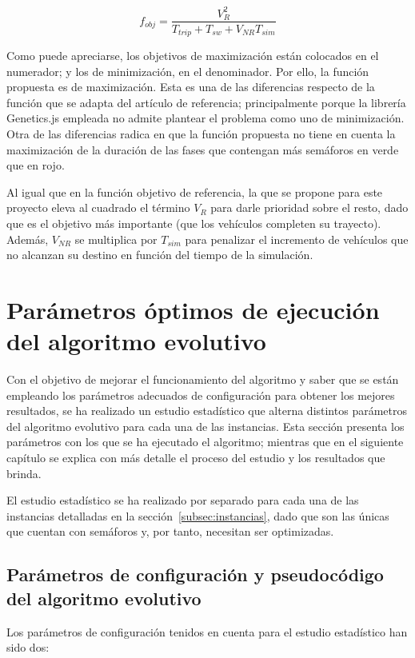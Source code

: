 $$
f_{obj} = \frac{V_R^2}{T_{trip} + T_{sw} + V_{NR} T_{sim}}
$$

Como puede apreciarse, los objetivos de maximización están colocados en el numerador; y los de minimización, en el denominador. Por ello, la función propuesta es de maximización. Esta es una de las diferencias respecto de la función que se adapta del artículo de referencia; principalmente porque la librería Genetics.js empleada no admite plantear el problema como uno de minimización. Otra de las diferencias radica en que la función propuesta no tiene en cuenta la maximización de la duración de las fases que contengan más semáforos en verde que en rojo.

Al igual que en la función objetivo de referencia, la que se propone para este proyecto eleva al cuadrado el término $V_R$ para darle prioridad sobre el resto, dado que es el objetivo más importante (que los vehículos completen su trayecto). Además, $V_{NR}$ se multiplica por $T_{sim}$ para penalizar el incremento de vehículos que no alcanzan su destino en función del tiempo de la simulación.

\section{Parámetros óptimos de ejecución del algoritmo evolutivo}

Con el objetivo de mejorar el funcionamiento del algoritmo y saber que se están empleando los parámetros adecuados de configuración para obtener los mejores resultados, se ha realizado un estudio estadístico que alterna distintos parámetros del algoritmo evolutivo para cada una de las instancias. Esta sección presenta los parámetros con los que se ha ejecutado el algoritmo; mientras que en el siguiente capítulo se explica con más detalle el proceso del estudio y los resultados que brinda.

El estudio estadístico se ha realizado por separado para cada una de las instancias detalladas en la sección~\ref{subsec:instancias}, dado que son las únicas que cuentan con semáforos y, por tanto, necesitan ser optimizadas.

\subsection{Parámetros de configuración y pseudocódigo del algoritmo evolutivo}
\label{subsec:parametros}

Los parámetros de configuración tenidos en cuenta para el estudio estadístico han sido dos:

